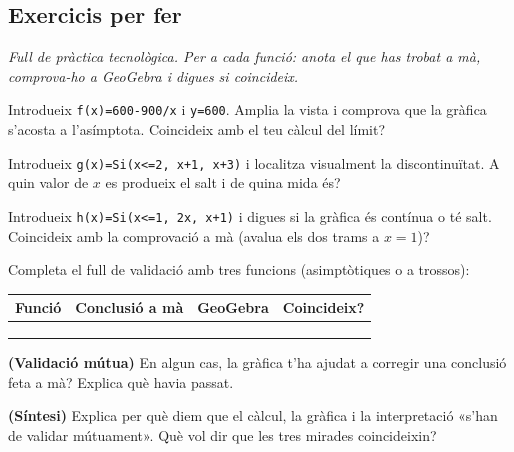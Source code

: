 \subsection{Exercicis per fer}

\noindent\textit{Full de pràctica tecnològica. Per a cada funció: anota el que has
trobat a mà, comprova-ho a GeoGebra i digues si coincideix.}

\begin{exercicis}
\begin{exlist}
  \item Introdueix \texttt{f(x)=600-900/x} i \texttt{y=600}. Amplia la vista i comprova
        que la gràfica s'acosta a l'asímptota. Coincideix amb el teu càlcul del límit?
  \item Introdueix \texttt{g(x)=Si(x<=2, x+1, x+3)} i localitza visualment la
        discontinuïtat. A quin valor de $x$ es produeix el salt i de quina mida és?
  \item Introdueix \texttt{h(x)=Si(x<=1, 2x, x+1)} i digues si la gràfica és contínua o
        té salt. Coincideix amb la comprovació a mà (avalua els dos trams a $x=1$)?
  \item Completa el full de validació amb tres funcions (asimptòtiques o a trossos):
        \begin{center}
        \renewcommand{\arraystretch}{1.4}
        \begin{tabular}{p{3.4cm} p{4.4cm} p{2.4cm} p{1.6cm}}
        \toprule
        \textbf{Funció} & \textbf{Conclusió a mà} & \textbf{GeoGebra} & \textbf{Coincideix?} \\
        \midrule
         & & & \\[10pt]
         & & & \\[10pt]
         & & & \\
        \bottomrule
        \end{tabular}
        \end{center}
  \item \textbf{(Validació mútua)} En algun cas, la gràfica t'ha ajudat a corregir una
        conclusió feta a mà? Explica què havia passat.
  \item \textbf{(Síntesi)} Explica per què diem que el càlcul, la gràfica i la
        interpretació «s'han de validar mútuament». Què vol dir que les tres mirades
        coincideixin?
\end{exlist}
\end{exercicis}

